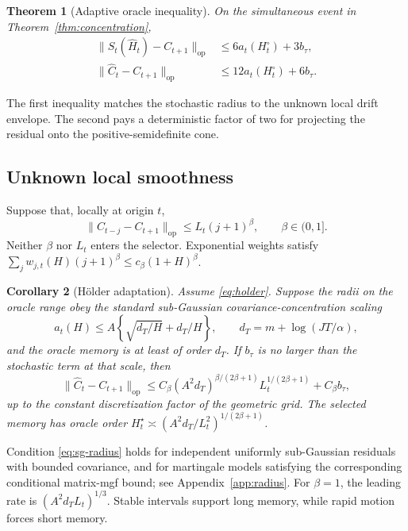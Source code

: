 \documentclass{article}
\newtheorem{theorem}{Theorem}
\newtheorem{corollary}[theorem]{Corollary}
\theoremstyle{definition}
\theoremstyle{remark}
\newcommand{\op}{\mathrm{op}}
\begin{document}
\begin{theorem}[Adaptive oracle inequality]
\label{thm:oracle}
On the simultaneous event in Theorem~\ref{thm:concentration},
\begin{align}
 \|S_t(\widehat H_t)-C_{t+1}\|_{\op}&\le6a_t(H_t^\circ)+3b_\tau,\label{eq:oracle}\\
 \|\widehat C_t-C_{t+1}\|_{\op}&\le12a_t(H_t^\circ)+6b_\tau.
 \label{eq:positive-part-bound}
\end{align}
\end{theorem}

The first inequality matches the stochastic radius to the unknown local drift envelope. The second pays a deterministic factor of two for projecting the residual onto the positive-semidefinite cone.

\subsection{Unknown local smoothness}

Suppose that, locally at origin $t$,
\begin{equation}
 \|C_{t-j}-C_{t+1}\|_{\op}\le L_t(j+1)^\beta,
 \qquad \beta\in(0,1].
 \label{eq:holder}
\end{equation}
Neither $\beta$ nor $L_t$ enters the selector. Exponential weights satisfy
$\sum_jw_{j,t}(H)(j+1)^\beta\le c_\beta(1+H)^\beta$.

\begin{corollary}[H\"older adaptation]
\label{cor:holder}
Assume \eqref{eq:holder}. Suppose the radii on the oracle range obey the standard sub-Gaussian covariance-concentration scaling
\begin{equation}
 a_t(H)\le A\left\{\sqrt{d_T/H}+d_T/H\right\},
 \qquad d_T=m+\log(JT/\alpha),
 \label{eq:sg-radius}
\end{equation}
and the oracle memory is at least of order $d_T$. If $b_\tau$ is no larger than the stochastic term at that scale, then
\begin{equation}
 \|\widehat C_t-C_{t+1}\|_{\op}
 \le C_\beta(A^2d_T)^{\beta/(2\beta+1)}L_t^{1/(2\beta+1)}+C_\beta b_\tau,
 \label{eq:holder-rate}
\end{equation}
up to the constant discretization factor of the geometric grid. The selected memory has oracle order
$H_t^\star\asymp(A^2d_T/L_t^2)^{1/(2\beta+1)}$.
\end{corollary}

Condition \eqref{eq:sg-radius} holds for independent uniformly sub-Gaussian residuals with bounded covariance, and for martingale models satisfying the corresponding conditional matrix-mgf bound; see Appendix~\ref{app:radius}. For $\beta=1$, the leading rate is $(A^2d_TL_t)^{1/3}$. Stable intervals support long memory, while rapid motion forces short memory.
\end{document}
